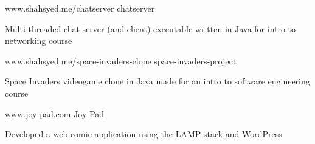 \begin{cventries}
  \cventry
    {www.shahsyed.me/chatserver}
    {chatserver}
    { }
    { }
    {
      \begin{cvitems}
        \item {Multi-threaded chat server (and client) executable written in Java for intro to networking course}
      \end{cvitems}
    }
    \cventry
    {www.shahsyed.me/space-invaders-clone}
    {space-invaders-project}
    { }
    { }
    {
      \begin{cvitems}
        \item {Space Invaders videogame clone in Java made for an intro to software engineering course}
      \end{cvitems}
    }
   \cventry
    {www.joy-pad.com}
    {Joy Pad}
    { }
    { }
    {
      \begin{cvitems}
        \item {Developed a web comic application using the LAMP stack and WordPress}
      \end{cvitems}
    }
\end{cventries}
